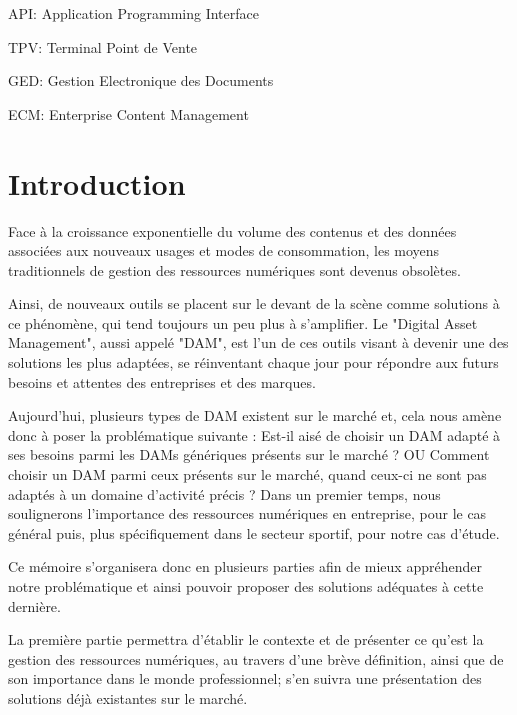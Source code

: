 \documentclass[a4paper, 12pt]{report}
\begin{document}
API: Application Programming Interface
\newline

TPV: Terminal Point de Vente 
\newline

GED: Gestion Electronique des Documents
\newline

ECM: Enterprise Content Management 

\tableofcontents
\listoffigures
\listoftables

\chapter*{Introduction}


Face à la croissance exponentielle du volume des contenus et des données associées aux nouveaux usages et modes de consommation, les moyens traditionnels de gestion des ressources numériques sont devenus obsolètes.
\newline

Ainsi, de nouveaux outils se placent sur le devant de la scène comme solutions à ce phénomène, qui tend toujours un peu plus à s'amplifier. Le "Digital Asset Management", aussi appelé "DAM", est l'un de ces outils visant à devenir une des solutions les plus adaptées, se réinventant chaque jour pour répondre aux futurs besoins et attentes des entreprises et des marques.
\newline

Aujourd'hui, plusieurs types de DAM existent sur le marché et, cela nous amène donc à poser la problématique suivante : Est-il aisé de choisir un DAM adapté à ses besoins parmi les DAMs génériques présents sur le marché ? OU Comment choisir un DAM parmi ceux présents sur le marché, quand ceux-ci ne sont pas adaptés à un domaine d'activité précis ?
Dans un premier temps, nous soulignerons l’importance des ressources numériques en entreprise, pour le cas général puis, plus spécifiquement dans le secteur sportif, pour notre cas d’étude.
\newline

Ce mémoire s'organisera donc en plusieurs parties afin de mieux appréhender notre problématique et ainsi pouvoir proposer des solutions adéquates à cette dernière.
\newline

La première partie permettra d'établir le contexte et de présenter ce qu'est la gestion des ressources numériques, au travers d'une brève définition, ainsi que de son importance dans le monde professionnel; s'en suivra une présentation des solutions déjà existantes sur le marché.
\newline
\end{document}
